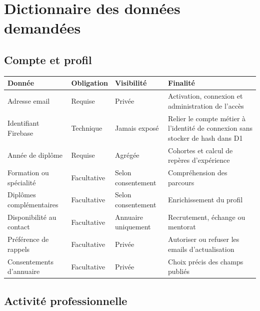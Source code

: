 \documentclass[11pt,a4paper]{article}
\begin{document}
\section{Dictionnaire des données demandées}

\subsection{Compte et profil}

\begin{longtable}{@{}L{43mm}L{30mm}L{28mm}L{65mm}@{}}
  \toprule
  \textbf{Donnée} & \textbf{Obligation} & \textbf{Visibilité} & \textbf{Finalité} \\
  \midrule
  \endhead
  Adresse email & Requise & Privée & Activation, connexion et administration de l'accès \\
  Identifiant Firebase & Technique & Jamais exposé & Relier le compte métier à l'identité de connexion sans stocker de hash dans D1 \\
  Année de diplôme & Requise & Agrégée & Cohortes et calcul de repères d'expérience \\
  Formation ou spécialité & Facultative & Selon consentement & Compréhension des parcours \\
  Diplômes complémentaires & Facultative & Selon consentement & Enrichissement du profil \\
  Disponibilité au contact & Facultative & Annuaire uniquement & Recrutement, échange ou mentorat \\
  Préférence de rappels & Facultative & Privée & Autoriser ou refuser les emails d'actualisation \\
  Consentements d'annuaire & Facultative & Privée & Choix précis des champs publiés \\
  \bottomrule
\end{longtable}

\subsection{Activité professionnelle}
\end{document}
